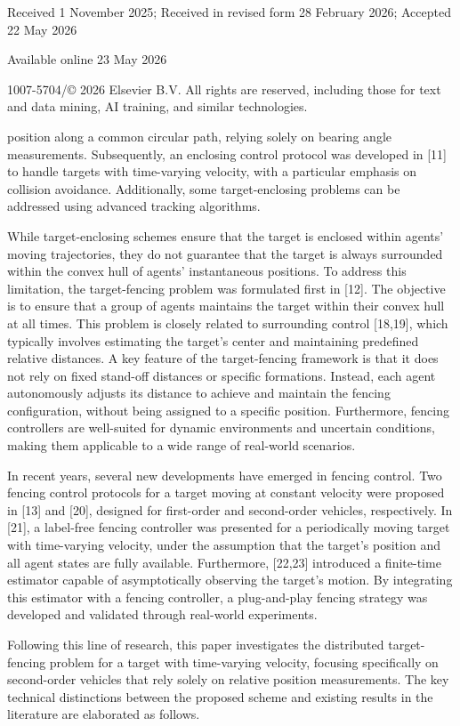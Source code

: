 Received 1 November 2025; Received in revised form 28 February 2026; Accepted 22 May 2026

Available online 23 May 2026

1007-5704/© 2026 Elsevier B.V. All rights are reserved, including those for text and data mining, AI training, and similar technologies.

position along a common circular path, relying solely on bearing angle measurements. Subsequently, an enclosing control protocol was developed in [11] to handle targets with time-varying velocity, with a particular emphasis on collision avoidance. Additionally, some target-enclosing problems can be addressed using advanced tracking algorithms.

While target-enclosing schemes ensure that the target is enclosed within agents' moving trajectories, they do not guarantee that the target is always surrounded within the convex hull of agents' instantaneous positions. To address this limitation, the target-fencing problem was formulated first in [12]. The objective is to ensure that a group of agents maintains the target within their convex hull at all times. This problem is closely related to surrounding control [18,19], which typically involves estimating the target's center and maintaining predefined relative distances. A key feature of the target-fencing framework is that it does not rely on fixed stand-off distances or specific formations. Instead, each agent autonomously adjusts its distance to achieve and maintain the fencing configuration, without being assigned to a specific position. Furthermore, fencing controllers are well-suited for dynamic environments and uncertain conditions, making them applicable to a wide range of real-world scenarios.

In recent years, several new developments have emerged in fencing control. Two fencing control protocols for a target moving at constant velocity were proposed in [13] and [20], designed for first-order and second-order vehicles, respectively. In [21], a label-free fencing controller was presented for a periodically moving target with time-varying velocity, under the assumption that the target's position and all agent states are fully available. Furthermore, [22,23] introduced a finite-time estimator capable of asymptotically observing the target's motion. By integrating this estimator with a fencing controller, a plug-and-play fencing strategy was developed and validated through real-world experiments.

Following this line of research, this paper investigates the distributed target-fencing problem for a target with time-varying velocity, focusing specifically on second-order vehicles that rely solely on relative position measurements. The key technical distinctions between the proposed scheme and existing results in the literature are elaborated as follows.

